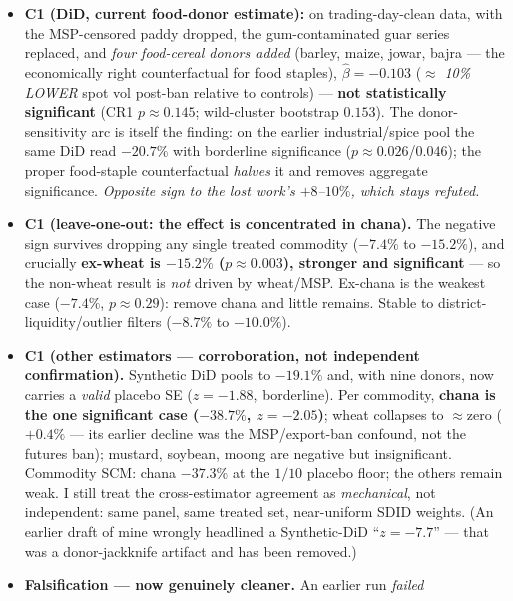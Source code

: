 \documentclass[11pt]{article}
\begin{document}
\begin{itemize}[leftmargin=1.6em]
  \item \textbf{C1 (DiD, current food-donor estimate):} on trading-day-clean data,
        with the MSP-censored paddy dropped, the gum-contaminated guar series replaced,
        and \emph{four food-cereal donors added} (barley, maize, jowar, bajra ---
        the economically right counterfactual for food staples),
        $\hat\beta=-0.103$ ($\approx$ \emph{10\% LOWER} spot vol post-ban relative to
        controls) --- \textbf{not statistically significant} (CR1 $p\approx0.145$;
        wild-cluster bootstrap $0.153$). The donor-sensitivity arc is itself the
        finding: on the earlier industrial/spice pool the same DiD read $-20.7\%$ with
        borderline significance ($p\approx0.026$/$0.046$); the proper food-staple
        counterfactual \emph{halves} it and removes aggregate significance.
        \emph{Opposite sign to the lost work's $+8$--$10\%$, which stays refuted.}
  \item \textbf{C1 (leave-one-out: the effect is concentrated in chana).} The
        negative sign survives dropping any single treated commodity ($-7.4\%$ to
        $-15.2\%$), and crucially \textbf{ex-wheat is $-15.2\%$ ($p\approx0.003$),
        stronger and significant} --- so the non-wheat result is \emph{not} driven by
        wheat/MSP. Ex-chana is the weakest case ($-7.4\%$, $p\approx0.29$): remove
        chana and little remains. Stable to district-liquidity/outlier filters
        ($-8.7\%$ to $-10.0\%$).
  \item \textbf{C1 (other estimators --- corroboration, not independent confirmation).}
        Synthetic DiD pools to $-19.1\%$ and, with nine donors, now carries a
        \emph{valid} placebo SE ($z=-1.88$, borderline). Per commodity, \textbf{chana
        is the one significant case ($-38.7\%$, $z=-2.05$)}; wheat collapses to
        $\approx$zero ($+0.4\%$ --- its earlier decline was the MSP/export-ban
        confound, not the futures ban); mustard, soybean, moong are negative but
        insignificant. Commodity SCM: chana $-37.3\%$ at the $1/10$ placebo floor;
        the others remain weak. I still treat the cross-estimator agreement as
        \emph{mechanical}, not independent: same panel, same treated set, near-uniform
        SDID weights. (An earlier draft of mine wrongly headlined a Synthetic-DiD
        ``$z=-7.7$'' --- that was a donor-jackknife artifact and has been removed.)
  \item \textbf{Falsification --- now genuinely cleaner.} An earlier run \emph{failed}

\end{itemize}
\end{document}
